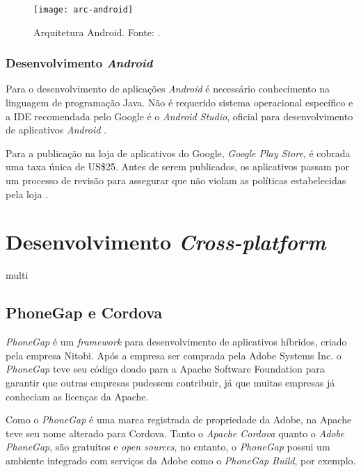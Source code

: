 \begin{figure}[h]
  \centering
    \texttt{[image: arc-android]}
    \caption[Arquitetura Android]{ Arquitetura Android. Fonte: \cite{android_android_2016}.}
	\label{fig:arc-android}
\end{figure}

\subsection{Desenvolvimento \textit{Android}} \label{subsec:dev-android}

Para o desenvolvimento de aplicações \textit{Android} é necessário conhecimento na linguagem de programação Java.
Não é requerido sistema operacional específico e a IDE recomendada pelo Google é o \textit{Android Studio}, oficial para desenvolvimento de aplicativos \textit{Android} \cite{android_meet_2016}.

Para a publicação na loja de aplicativos do Google, \textit{Google Play Store}, é cobrada uma taxa única de US\$25. 
Antes de serem publicados, os aplicativos passam por um processo de revisão para assegurar que não violam as políticas estabelecidas pela loja \cite{meier_creating_2015}.  

\chapter{Desenvolvimento \textit{Cross-platform}} \label{cap:desenvolvimentomulti}

multi

\section{PhoneGap e Cordova} \label{sec:phonegap}

\textit{PhoneGap} é um \textit{framework} para desenvolvimento de aplicativos híbridos, criado pela empresa Nitobi. 
Após a empresa ser comprada pela Adobe Systems Inc. o \textit{PhoneGap} teve seu código doado para a Apache Software Foundation 
para garantir que outras empresas pudessem contribuir, já que muitas empresas já conheciam as licenças da Apache.


Como o \textit{PhoneGap} é uma marca registrada de propriedade da Adobe, na Apache teve seu nome alterado para Cordova.
Tanto o \textit{Apache Cordova} quanto o \textit{Adobe PhoneGap}, são gratuitos e \textit{open sources}, no entanto, o 
\textit{PhoneGap} possui um ambiente integrado com serviços da Adobe como o \textit{PhoneGap Build}, por exemplo.
 
